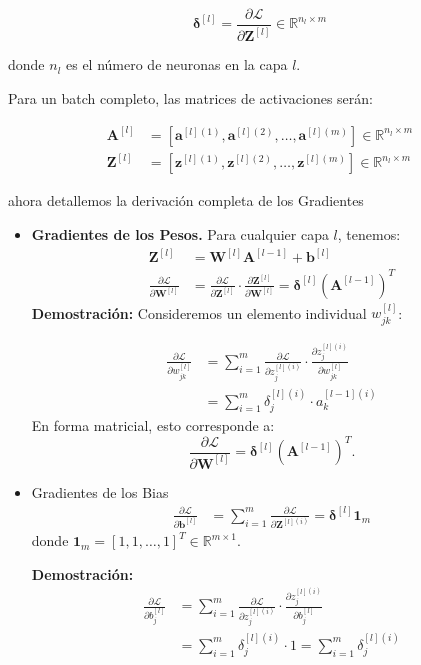 \documentclass[12pt]{article}
\begin{document}
\begin{equation}
\boldsymbol{\delta}^{[l]} = \frac{\partial \mathcal{L}}{\partial \mathbf{Z}^{[l]}} \in \mathbb{R}^{n_l \times m}
\end{equation}

donde $n_l$ es el número de neuronas en la capa $l$.

Para un batch completo, las matrices de activaciones serán:

\begin{align}
\mathbf{A}^{[l]} &= [\mathbf{a}^{[l](1)}, \mathbf{a}^{[l](2)}, \dots, \mathbf{a}^{[l](m)}] \in \mathbb{R}^{n_l \times m} \\
\mathbf{Z}^{[l]} &= [\mathbf{z}^{[l](1)}, \mathbf{z}^{[l](2)}, \dots, \mathbf{z}^{[l](m)}] \in \mathbb{R}^{n_l \times m}
\end{align}

ahora detallemos la derivación completa de los Gradientes

\begin{itemize}
    \item \textbf{Gradientes de los Pesos.} Para cualquier capa $l$, tenemos:
%
\begin{align}
\mathbf{Z}^{[l]} &= \mathbf{W}^{[l]} \mathbf{A}^{[l-1]} + \mathbf{b}^{[l]} \\
\frac{\partial \mathcal{L}}{\partial \mathbf{W}^{[l]}} &= \frac{\partial \mathcal{L}}{\partial \mathbf{Z}^{[l]}} \cdot \frac{\partial \mathbf{Z}^{[l]}}{\partial \mathbf{W}^{[l]}} = \boldsymbol{\delta}^{[l]} (\mathbf{A}^{[l-1]})^T
\end{align}
%
\textbf{Demostración:} Consideremos un elemento individual $w_{jk}^{[l]}$:

\begin{align}
\frac{\partial \mathcal{L}}{\partial w_{jk}^{[l]}} &= \sum_{i=1}^m \frac{\partial \mathcal{L}}{\partial z_{j}^{[l](i)}} \cdot \frac{\partial z_{j}^{[l](i)}}{\partial w_{jk}^{[l]}} \\
&= \sum_{i=1}^m \delta_{j}^{[l](i)} \cdot a_{k}^{[l-1](i)}
\end{align}
%
En forma matricial, esto corresponde a:
%
\begin{equation}
\frac{\partial \mathcal{L}}{\partial \mathbf{W}^{[l]}} = \boldsymbol{\delta}^{[l]} (\mathbf{A}^{[l-1]})^T.
\end{equation}
%
\item Gradientes de los Bias
%
\begin{align}
\frac{\partial \mathcal{L}}{\partial \mathbf{b}^{[l]}} &= \sum_{i=1}^m \frac{\partial \mathcal{L}}{\partial \mathbf{Z}^{[l](i)}} = \boldsymbol{\delta}^{[l]} \mathbf{1}_m
\end{align}
%
donde $\mathbf{1}_m = [1, 1, \dots, 1]^T \in \mathbb{R}^{m \times 1}$.

\textbf{Demostración:}
%
\begin{align}
\frac{\partial \mathcal{L}}{\partial b_j^{[l]}} &= \sum_{i=1}^m \frac{\partial \mathcal{L}}{\partial z_j^{[l](i)}} \cdot \frac{\partial z_j^{[l](i)}}{\partial b_j^{[l]}} \\
&= \sum_{i=1}^m \delta_j^{[l](i)} \cdot 1 = \sum_{i=1}^m \delta_j^{[l](i)}
\end{align}
\end{itemize}
\end{document}
